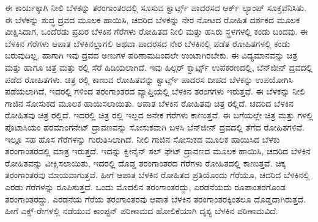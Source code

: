 ಈ ಕಾರ್ಯಕ್ಕಾಗಿ ನೀಲಿ ಬೆಳಕನ್ನು  ತರಂಗಾಂತರದಲ್ಲಿ ಸೂಸುವ ಕ್ವಾರ್ಟ್ಸ್ ಪಾದರಸದ ಆರ್ಕ್ ಲ್ಯಾಂಪ್ ಸೂಕ್ತವೆನಿಸಿತು. ಈ ಬೆಳಕನ್ನು ಶುದ್ಧ ದ್ರವದ ಮೂಲಕ ಹಾಯಿಸಿ, ಚದರಿದ ಬೆಳಕನ್ನು ನೇರ ನೋಟದ ರೋಹಿತ ದರ್ಶಕದ ಮೂಲಕ ವೀಕ್ಷಿಸಿದಾಗ, ಒಂದೆರಡು ಪ್ರಖರ ಬೆಳಕಿನ ಗೆರೆಗಳು ರೋಹಿತದ ನೀಲಿ ಮತ್ತು ಹಸಿರು ಸ್ಥಳಗಳಲ್ಲಿ ಕಂಡು ಬಂದವು. ಈ ಬೆಳಕಿನ ಗೆರೆಗಳು ಆಪಾತ ಬೆಳಕಿನಲ್ಲಾಗಲಿ ಅಥವಾ ಪಾದರಸದ ನೇರ ಬೆಳಕಿನಲ್ಲಿ ಪಡೆತ ರೋಹಿತಗಳಲ್ಲಿ ಕಂಡು ಬರುವುದಿಲ್ಲ. ಹಾಗಾಗಿ ಇವು ದ್ರವದ ಅಣುಗಳ ಪರಿಣಾಮದಿಂದಲೇ ಉಂಟಾಗಿರಬೇಕು. ಈ ವಿದ್ಯಮಾನವನ್ನು ಚಿತ್ರ  ಮತ್ತು  ಹಾಗೂ ಚಿತ್ರ  ಮತ್ತು ರಲ್ಲಿ ಸೆರೆ ಹಿಡಿಯಲಾಗಿದೆ. ಇವು ಹಿಲ್ಗರ್ ಕ್ವಾರ್ಟ್ಸ್ ಉಪಕರಣದಲ್ಲಿ, ಬೆನ್‍ಜೀನ್ ದ್ರವದಲ್ಲಿ ಪಡೆದ ರೋಹಿತಗಳು. ಚಿತ್ರ ರಲ್ಲಿ ಕಾಣುವ ರೋಹಿತವನ್ನು ಕ್ವಾರ್ಟ್ಸ್ ಪಾದರಸ ದೀಪದ ಬೆಳಕನ್ನು ಉಪಯೋಗಿಸಿ ಪಡೆಯಲಾಗಿದೆ, ಇದರಲ್ಲಿ  ಗಳಿಂದ  ತರಂಗಾಂತರದ ವ್ಯಾಪ್ತಿಯಲ್ಲಿ ಬೆಳಕಿನ ತರಂಗಗಳು ಇರುತ್ತವೆ. ಈ ಬೆಳಕನ್ನು ನೀಲಿ ಗಾಜಿನ ಸೋಸುಕದ ಮೂಲಕ ಹಾಯಿಸಲಾಯಿತು. ಆಪಾತ ಬೆಳಕಿನ ರೋಹಿತವು ಚಿತ್ರ ರಲ್ಲಿದೆ. ಚದರಿದ ಬೆಳಕಿನ ರೋಹಿತವು ಚಿತ್ರ ರಲ್ಲಿದೆ. ಇದರಲ್ಲಿ ಚಿತ್ರ ರಲ್ಲಿ ಇಲ್ಲದ ಅನೇಕ ಗೆರೆಗಳು ಕಾಣುತ್ತವೆ. ಈ ಬಗೆಯಲ್ಲೇ ಚಿತ್ರ  ಮತ್ತು  ಗಳಲ್ಲಿ ಪೊಟಾಸಿಯಂ ಪರಮಾಂಗನೇಟ್ ದ್ರಾವಣವನ್ನು ಸೋಸುಕವಾಗಿ ಬಳಸಿ ಬೆನ್‍ಜೀನ್ ದ್ರವದಲ್ಲಿ ತೆಗೆದ ರೋಹಿತಗಳಿವೆ. ಇಲ್ಲೂ ಸಹ ಹೊಸ ಗೆರೆಗಳನ್ನು ಗುರುತಿಸಿಲಾಗಿದೆ. ನೀಲಿ ಗಾಜಿನ ಸೋಸುಕದ ಮೂಲಕ ಹಾಯಿಸಿದ ಬೆಳಕು  ತರಂಗಾಂತರದಲ್ಲಿ ಮಾತ್ರ ಇರುತ್ತದೆ. ಇದನ್ನು ಕ್ವೀನೈನ್ ಸಲ್ ಫೇಟ್ ದ್ರಾವಣದ ಮೂಲಕ ಹಾಯಿಸಿ, ಚದರಿದ ಬೆಳಕಿನ ರೋಹಿತವನ್ನು ವೀಕ್ಷಿಸಲಾಯಿತು, ಇದರಲ್ಲಿ ದೊಡ್ಡ ತರಂಗಾಂತರದ ಗೆರೆಗಳು ರೋಹಿತದಲ್ಲಿ ಕಾಣುತ್ತವೆ. ಚಿಕ್ಕ ತರಂಗಾಂತರವು ಮಾಯವಾಗುತ್ತವೆ. ಹೀಗೆ ಆಪಾತ ಬೆಳಕಿನ ರೋಹಿತದ ಪ್ರತಿಯೊಂದು ಗೆರೆಯೂ, ಚದರಿದ ಬೆಳಕಿನಲ್ಲಿ ಎರಡು ಗೆರೆಗಳನ್ನು ರೂಪಿಸುತ್ತದೆ. ಒಂದು ಮೊದಲಿನ ತರಂಗಾಂತರದ್ದು, ಎರಡನೆಯದು ರೂಪಾಂತರಗೊಂಡ ತರಂಗಾಂತರದ್ದು. ಎರಡನೆಯ ಗೆರೆಯ ತರಂಗಾಂತರವು ಆಪಾತ ಬೆಳಕಿನ ತರಂಗಾಂತರಕ್ಕಿಂತಲೂ ದೊಡ್ಡದಾಗಿರುತ್ತದೆ. ಹೀಗೆ ಎಕ್ಸ್-ರೇಗಳಲ್ಲಿ ನಡೆಯುವ ಕಾಂಪ್ಟನ್ ಪರಿಣಾಮದ ಹೋಲಿಕೆಯಾಗಿ ದೃಶ್ಯ ಬೆಳಕಿನ ಪರಿಣಾಮವಿದೆ.

